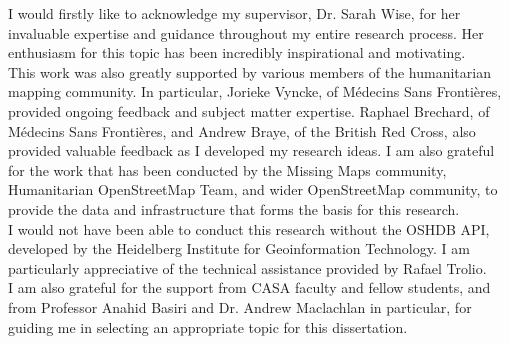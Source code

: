 \begin{acknowledgements}

\noindent I would firstly like to acknowledge my supervisor, Dr. Sarah Wise, for her invaluable expertise and guidance throughout my entire research process. Her enthusiasm for this topic has been incredibly inspirational and motivating.  \\

\noindent This work was also greatly supported by various members of the humanitarian mapping community. In particular, Jorieke Vyncke, of Médecins Sans Frontières, provided ongoing feedback and subject matter expertise. Raphael Brechard, of Médecins Sans Frontières, and Andrew Braye, of the British Red Cross, also provided valuable feedback as I developed my research ideas. I am also grateful for the work that has been conducted by the Missing Maps community, Humanitarian OpenStreetMap Team, and wider OpenStreetMap community, to provide the data and infrastructure that forms the basis for this research. \\

\noindent I would not have been able to conduct this research without the OSHDB API, developed by the Heidelberg Institute for Geoinformation Technology. I am particularly appreciative of the technical assistance provided by Rafael Trolio.  \\

\noindent I am also grateful for the support from CASA faculty and fellow students, and from Professor Anahid Basiri and Dr. Andrew Maclachlan in particular, for guiding me in selecting an appropriate topic for this dissertation.

\end{acknowledgements}

